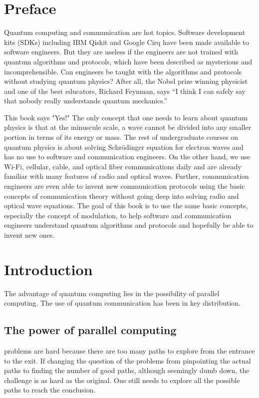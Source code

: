 \documentclass[Letter,11pt]{book}
\begin{document}
%

\chapter*{Preface}
Quantum computing and communication are hot topics. Software development kits (SDKs) including IBM Qiskit and Google Cirq have been made available to software engineers. But they are useless if the engineers are not trained with quantum algorithms and protocols, which have been described as mysterious and incomprehensible. Can engineers be taught with the algorithms and protocols without studying quantum physics? After all, the Nobel prize winning physicist and one of the best educators, Richard Feynman, says “I think I can safely say that nobody really understands quantum mechanics.”

This book says "Yes!" The only concept that one needs to learn about quantum physics is that at the minuscule scale, a wave cannot be divided into any smaller portion in terms of its energy or mass. The rest of undergraduate courses on quantum physics is about solving Schrödinger equation for electron waves and has no use to software and communication engineers. On the other hand, we use Wi-Fi, cellular, cable, and optical fiber communications daily and are already familiar with many features of radio and optical waves. Further, communication engineers are even able to invent new communication protocols using the basic concepts of communication theory without going deep into solving radio and optical wave equations. The goal of this book is to use the same basic concepts, especially the concept of modulation, to help software and communication engineers understand quantum algorithms and protocols and hopefully be able to invent new ones.

\setcounter{tocdepth}{3}
\tableofcontents

\mainmatter

\chapter{Introduction}\label{Introduction}
The advantage of quantum computing lies in the possibility of parallel computing. The use of quantum communication has been in key distribution.

\section{The power of parallel computing}
 problems are hard because there are too many paths to explore from the entrance to the exit. If changing the question of the problems from pinpointing the actual paths to finding the number of good paths, although seemingly dumb down, the challenge is as hard as the original. One still needs to explore all the possible paths to reach the conclusion.
\end{document}
